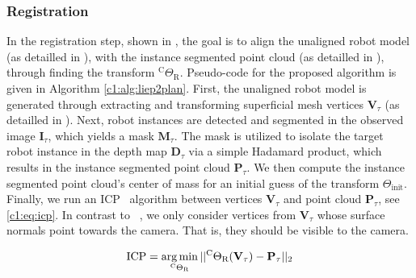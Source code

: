 \subsubsection{Registration}
\label{c1:sec:registration}
In the registration step, shown in , the goal is to align the unaligned robot model (as detailled in ), with the instance segmented point cloud (as detailled in ), through finding the transform $^\text{C}\Theta_\text{R}$. Pseudo-code for the proposed algorithm is given in Algorithm \ref{c1:alg:liep2plan}.
First, the unaligned robot model is generated through extracting and transforming superficial mesh vertices $\mathbf{V}_\tau$ (as detailled in ).
Next, robot instances are detected and segmented in the observed image $\mathbf{I}_\tau$, which yields a mask $\mathbf{M}_\tau$.
The mask is utilized to isolate the target robot instance in the depth map $\mathbf{D}_\tau$ via a simple Hadamard product, which results in the instance segmented point cloud $\mathbf{P}_\tau$.
We then compute the instance segmented point cloud's center of mass for an initial guess of the transform $\Theta_\text{init}$. Finally, we run an ICP~\citep{simple_icp} algorithm between vertices $\mathbf{V}_\tau$ and point cloud $\mathbf{P}_\tau$, see \eqref{c1:eq:icp}. In contrast to ~\citep{simple_icp}, we only consider vertices from $\mathbf{V}_\tau$ whose surface normals point towards the camera. That is, they should be visible to the camera.

\begin{equation}
    \label{c1:eq:icp}
    \text{ICP} = \argmin_{^\text{C}\Theta_\text{R}} || ^\text{C}\Theta_\text{R}(\mathbf{V}_\tau) - \mathbf{P}_\tau||_2
\end{equation}



